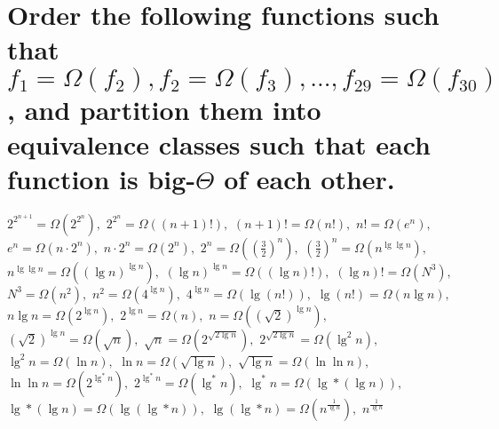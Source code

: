 \section[Problem 6]{Order the following functions such that $f_1 = \Omega(f_2), f_2 = \Omega(f_3), ..., f_{29} = \Omega(f_{30})$, and partition them into equivalence classes such that each function is big-$\Theta$ of each other.}

$2^{2^{n + 1}} = \Omega \left(2^{2^n} \right), $
$2^{2^n} = \Omega \left((n + 1)! \right), $
$(n + 1)! = \Omega \left(n! \right), $
$n! = \Omega \left(e^n \right), $
$e^n = \Omega \left(n \cdot 2^n \right), $
$n \cdot 2^n = \Omega \left(2^n \right), $
$2^n = \Omega \left(\left( \frac{3}{2} \right)^n \right), $
$\left( \frac{3}{2} \right)^n = \Omega \left(n^{\lg \lg n} \right), $
$n^{\lg \lg n} = \Omega \left(\left( \lg n \right)^{\lg n} \right), $
$\left( \lg n \right)^{\lg n} = \Omega \left((\lg n)! \right), $
$(\lg n)! = \Omega \left(N^3 \right), $
$N^3 = \Omega \left(n^2 \right), $
$n^2 = \Omega \left(4^{\lg n} \right), $
$4^{\lg n} = \Omega \left(\lg (n!) \right), $
$\lg (n!)  = \Omega \left(n \lg n \right), $
$n \lg n = \Omega \left(2^{\lg n} \right), $
$2^{\lg n} = \Omega \left(n \right), $
$n = \Omega \left(\left( \sqrt{2} \right)^{\lg n} \right), $
$\left( \sqrt{2} \right)^{\lg n} = \Omega \left(\sqrt{n} \right), $
$\sqrt{n} = \Omega \left(2^{\sqrt{2 \lg n}} \right), $
$2^{\sqrt{2 \lg n}} = \Omega \left(\lg ^2 n \right), $
$\lg ^2 n = \Omega \left(\ln n \right), $
$\ln n = \Omega \left(\sqrt{\lg n} \right), $
$\sqrt{\lg n} = \Omega \left(\ln \ln n \right), $
$\ln \ln n = \Omega \left(2^{\lg ^* n} \right), $
$2^{\lg ^* n} = \Omega \left(\lg ^* n \right), $
$\lg ^* n = \Omega \left(\lg * (\lg n) \right), $
$\lg * (\lg n) = \Omega \left(\lg (\lg * n) \right), $
$\lg (\lg * n) = \Omega \left(n^{\frac{1}{\lg n}} \right), $
$n^{\frac{1}{\lg n}}$
